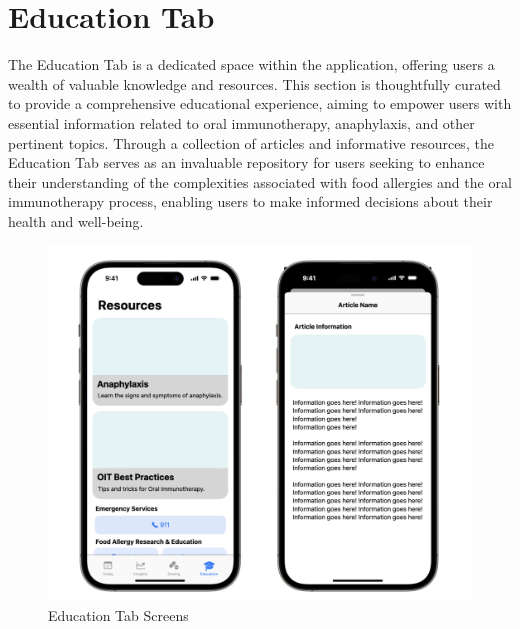 \section{Education Tab}

The Education Tab is a dedicated space within the application, offering users a wealth of valuable knowledge and resources. This section is thoughtfully curated to provide a comprehensive educational experience, aiming to empower users with essential information related to oral immunotherapy, anaphylaxis, and other pertinent topics. Through a collection of articles and informative resources, the Education Tab serves as an invaluable repository for users seeking to enhance their understanding of the complexities associated with food allergies and the oral immunotherapy process, enabling users to make informed decisions about their health and well-being.

\begin{figure}[H]
    \centering
    \includegraphics[width=0.5\linewidth]{thesis//chapters//images/education-tab-screens.png}
    \caption{Education Tab Screens}
    \label{fig:education-tab}
\end{figure}

